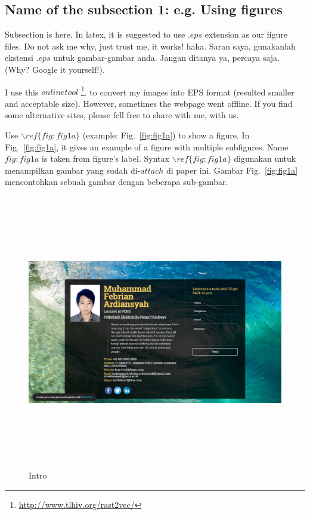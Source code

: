 \documentclass[preprint]{elsarticle}
\begin{document}
\subsection{Name of the subsection 1: e.g. Using figures}
Subsection is here. In latex, it is suggested to use $.eps$ extension as our figure files. Do not ask me why, just trust me, it works! haha. Saran saya, gunakanlah ekstensi $.eps$ untuk gambar-gambar anda. Jangan ditanya ya, percaya saja. (Why? Google it yourself!). 

I use this $online tool$ \footnote{\label{note:eps_converter1}\url{http://www.tlhiv.org/rast2vec/}}. to convert my images into EPS format (resulted smaller and acceptable size). However, sometimes the webpage went offline. If you find some alternative sites, please fell free to share with me, with us.

Use $\backslash ref\{fig:fig1a\}$ (example: Fig.~\ref{fig:fig1a}) to show a figure. In Fig.~\ref{fig:fig1a}, it gives an example of a figure with multiple subfigures. Name $fig:fig1a$ is taken from figure's label. Syntax $\backslash ref\{fig:fig1a\}$ digunakan untuk menampilkan gambar yang sudah di-$attach$ di paper ini. Gambar Fig.~\ref{fig:fig1a} mencontohkan sebuah gambar dengan beberapa sub-gambar.

\begin{figure}[H]
\centering
\includegraphics[width=120mm, height=120mm, keepaspectratio]{intro}
\caption{Intro}
\label{fig:fig2}
\end{figure}
\end{document}
